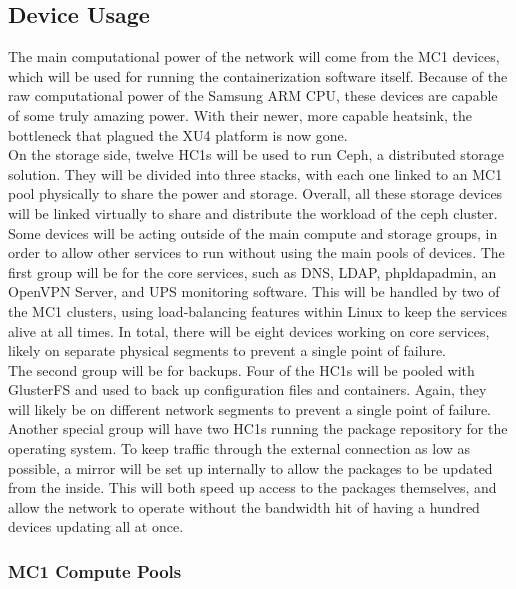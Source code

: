 \documentclass[12pt]{spieman}  %
\begin{document}
\subsection{Device Usage}
\label{subsec:arm-usage}

The main computational power of the network will come from the MC1 devices, which will be used for running the containerization software itself. Because of the raw computational power of the Samsung ARM CPU, these devices are capable of some truly amazing power. With their newer, more capable heatsink, the bottleneck that plagued the XU4 platform is now gone.\\

On the storage side, twelve HC1s will be used to run Ceph, a distributed storage solution. They will be divided into three stacks, with each one linked to an MC1 pool physically to share the power and storage. Overall, all these storage devices will be linked virtually to share and distribute the workload of the ceph cluster.\\

Some devices will be acting outside of the main compute and storage groups, in order to allow other services to run without using the main pools of devices. The first group will be for the core services, such as DNS, LDAP, phpldapadmin, an OpenVPN Server, and UPS monitoring software. This will be handled by two of the MC1 clusters, using load-balancing features within Linux to keep the services alive at all times. In total, there will be eight devices working on core services, likely on separate physical segments to prevent a single point of failure.\\

The second group will be for backups. Four of the HC1s will be pooled with GlusterFS and used to back up configuration files and containers. Again, they will likely be on different network segments to prevent a single point of failure.\\

Another special group will have two HC1s running the package repository for the operating system. To keep traffic through the external connection as low as possible, a mirror will be set up internally to allow the packages to be updated from the inside. This will both speed up access to the packages themselves, and allow the network to operate without the bandwidth hit of having a hundred devices updating all at once.

\subsubsection{MC1 Compute Pools}
\label{subsubsec:arm-usage-mc1-compute}
\end{document}
